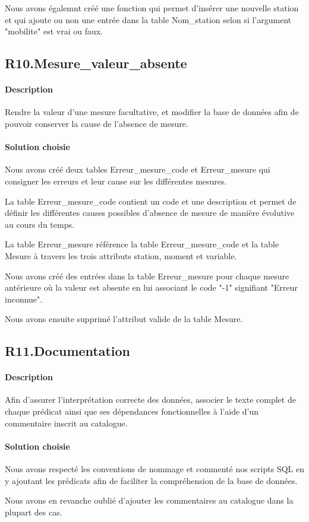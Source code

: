 \documentclass{article}
\begin{document}
Nous avons égalemnt créé une fonction qui permet d'insérer une nouvelle station
et qui ajoute ou non une entrée dans la table Nom\_station selon si l'argument
"mobilite" est vrai ou faux.

\subsection{R10.Mesure\_valeur\_absente}
\paragraph{Description} Rendre la valeur d'une mesure facultative, et modifier la base de données
afin de pouvoir conserver la cause de l'absence de mesure.

\paragraph{Solution choisie}
Nous avons créé deux tables Erreur\_mesure\_code et Erreur\_mesure qui consigner
les erreurs et leur cause sur les différentes mesures.

La table Erreur\_mesure\_code contient un code et une description et permet
de définir les différentes causes possibles d'absence de mesure de manière
évolutive au cours du temps.

La table Erreur\_mesure référence la table Erreur\_mesure\_code et la table Mesure
à travers les trois attributs station, moment et variable.

Nous avons créé des entrées dans la table Erreur\_mesure pour chaque mesure antérieure
où la valeur est absente en lui associant le code "-1" signifiant "Erreur inconnue".

Nous avons ensuite supprimé l'attribut valide de la table Mesure.

\subsection{R11.Documentation}
\paragraph{Description} Afin d'assurer l'interprétation correcte des données, associer
le texte complet de chaque prédicat ainsi que ses dépendances fonctionnelles à l'aide
d'un commentaire inscrit au catalogue.

\paragraph{Solution choisie}
Nous avons respecté les conventions de nommage et commenté nos scripts
SQL en y ajoutant les prédicats afin de faciliter la compréhension de la base de données.

Nous avons en revanche oublié d'ajouter les commentaires au catalogue dans la plupart des cas.
\end{document}
